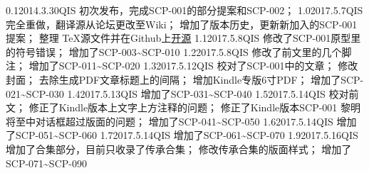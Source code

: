 


\begin{versionhistory}
\vhEntry
{0.1}{2014.3.30}{QIS}{
	初次发布，完成SCP-001的部分提案和SCP-002；
}
\vhEntry
{1.0}{2017.5.7}{QIS}{
	完全重做，翻译源从论坛更改至Wiki；
	增加了版本历史，更新新加入的SCP-001提案；
	整理 \TeX 源文件并在Github上\href{https://github.com/7sDream/scp-pdf}{开源}
}
\vhEntry
{1.1}{2017.5.8}{QIS}{
	修改了SCP-001原型里的符号错误；
	增加了SCP-003\textasciitilde SCP-010
}
\vhEntry
{1.2}{2017.5.8}{QIS}{
	修改了前文里的几个脚注；
	增加了SCP-011\textasciitilde SCP-020
}
\vhEntry
{1.3}{2017.5.12}{QIS}{
	校对了SCP-001中的文章；
	修改封面；
	去除生成PDF文章标题上的间隔；
	增加Kindle专版6寸PDF；
	增加了SCP-021\textasciitilde SCP-030
}
\vhEntry
{1.4}{2017.5.13}{QIS}{
    增加了SCP-031\textasciitilde SCP-040
}
\vhEntry
{1.5}{2017.5.14}{QIS}{
    校对前文；
    修正了Kindle版本上文字上方注释的问题；
    修正了Kindle版本SCP-001 黎明将至中对话框超过版面的问题；
    增加了SCP-041\textasciitilde SCP-050
}
\vhEntry
{1.6}{2017.5.14}{QIS}{
    增加了SCP-051\textasciitilde SCP-060
}
\vhEntry
{1.7}{2017.5.14}{QIS}{
    增加了SCP-061\textasciitilde SCP-070
}
\vhEntry
{1.9}{2017.5.16}{QIS}{
    增加了合集部分，目前只收录了传承合集；
    修改传承合集的版面样式；
    增加了SCP-071\textasciitilde SCP-090
}
\end{versionhistory}
